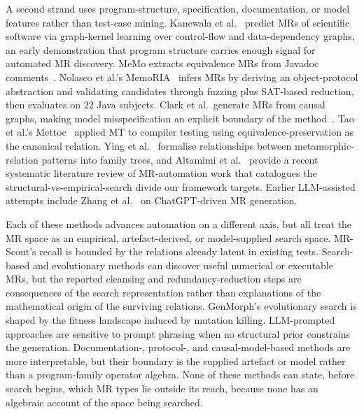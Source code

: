 \documentclass[manuscript]{acmart}
\begin{document}
A second strand uses program-structure, specification, documentation, or model features rather than test-case mining. Kanewala et al.~\cite{Kanewala2016GraphKernel} predict MRs of scientific software via graph-kernel learning over control-flow and data-dependency graphs, an early demonstration that program structure carries enough signal for automated MR discovery. MeMo extracts equivalence MRs from Javadoc comments~\cite{Blasi2021MeMo}. Nolasco et al.'s MemoRIA~\cite{Nolasco2024MemoRIA} infers MRs by deriving an object-protocol abstraction and validating candidates through fuzzing plus SAT-based reduction, then evaluates on 22 Java subjects. Clark et al.\ generate MRs from causal graphs, making model misspecification an explicit boundary of the method~\cite{Clark2023CausalMT}. Tao et al.'s Mettoc~\cite{Tao2010Mettoc} applied MT to compiler testing using equivalence-preservation as the canonical relation. Ying et al.~\cite{Ying2025MRPatterns} formalise relationships between metamorphic-relation patterns into family trees, and Altamimi et al.~\cite{Altamimi2022MRSLR} provide a recent systematic literature review of MR-automation work that catalogues the structural-vs-empirical-search divide our framework targets. Earlier LLM-assisted attempts include Zhang et al.~\cite{ZhangChatGPTMR2023} on ChatGPT-driven MR generation.

Each of these methods advances automation on a different axis, but all treat the MR space as an empirical, artefact-derived, or model-supplied search space. MR-Scout's recall is bounded by the relations already latent in existing tests. Search-based and evolutionary methods can discover useful numerical or executable MRs, but the reported cleansing and redundancy-reduction steps are consequences of the search representation rather than explanations of the mathematical origin of the surviving relations. GenMorph's evolutionary search is shaped by the fitness landscape induced by mutation killing. LLM-prompted approaches are sensitive to prompt phrasing when no structural prior constrains the generation. Documentation-, protocol-, and causal-model-based methods are more interpretable, but their boundary is the supplied artefact or model rather than a program-family operator algebra. None of these methods can state, before search begins, which MR types lie outside its reach, because none has an algebraic account of the space being searched.
\end{document}
